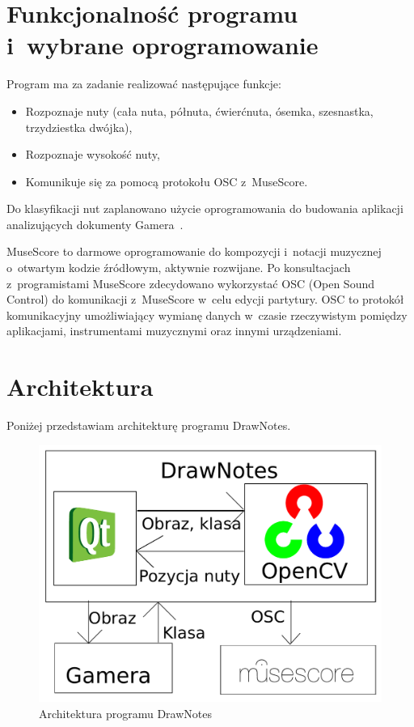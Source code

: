 \documentclass[polish,thesis,12pt]{dcsbook}
\begin{document}
\section{Funkcjonalność programu i~wybrane oprogramowanie}
Program ma za zadanie realizować następujące funkcje:
\begin{itemize}
  \item Rozpoznaje nuty (cała nuta, półnuta, ćwierćnuta, ósemka, szesnastka, trzydziestka dwójka),
  \item Rozpoznaje wysokość nuty,
  \item Komunikuje się za pomocą protokołu OSC z~MuseScore.
\end{itemize}

Do klasyfikacji nut zaplanowano użycie oprogramowania do budowania aplikacji analizujących dokumenty Gamera~\cite{Gamera}.

MuseScore to darmowe oprogramowanie do kompozycji i~notacji muzycznej o~otwartym kodzie źródłowym, aktywnie rozwijane.
Po konsultacjach z~programistami MuseScore zdecydowano wykorzystać OSC (Open Sound Control) do komunikacji z~MuseScore w~celu edycji partytury. OSC to protokół komunikacyjny umożliwiający wymianę danych w~czasie rzeczywistym pomiędzy aplikacjami, instrumentami muzycznymi oraz innymi urządzeniami.

\newpage
\section{Architektura}
Poniżej przedstawiam architekturę programu DrawNotes.
\begin{figure}[H]
  \centering
  \includegraphics[scale=0.8,bb=0 0 512 384]{img/demo.pdf}
  \caption{Architektura programu DrawNotes}
  \label{demo}
\end{figure}
\end{document}
